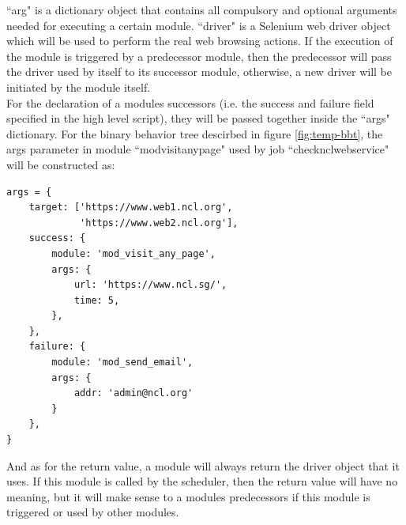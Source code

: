 \documentclass[12pt]{report}
\begin{document}
``arg" is a dictionary object that contains all compulsory and optional arguments needed for executing a certain module. ``driver" is a Selenium web driver object which will be used to perform the real web browsing actions. If the execution of the module is triggered by a predecessor module, then the predecessor will pass the driver used by itself to its successor module, otherwise, a new driver will be initiated by the module itself.\\

For the declaration of a module\textquotesingle s successors (i.e. the success and failure field specified in the high level script), they will be passed together inside the ``args" dictionary. For the binary behavior tree descirbed in figure \ref{fig:temp-bbt}, the args parameter in module ``mod\textunderscore visit\textunderscore any\textunderscore page" used by job ``check\textunderscore ncl\textunderscore web\textunderscore service" will be constructed as:

\begin{lstlisting}
args = {
    target: ['https://www.web1.ncl.org',
             'https://www.web2.ncl.org'],
    success: {
        module: 'mod_visit_any_page',
        args: {
            url: 'https://www.ncl.sg/',
            time: 5,
        },
    },
    failure: {
        module: 'mod_send_email',
        args: {
            addr: 'admin@ncl.org'
        }
    },
}
\end{lstlisting}

And as for the return value, a module will always return the driver object that it uses. If this module is called by the scheduler, then the return value will have no meaning, but it will make sense to a module\textquotesingle s predecessors if this module is triggered or used by other modules. \\
\end{document}

